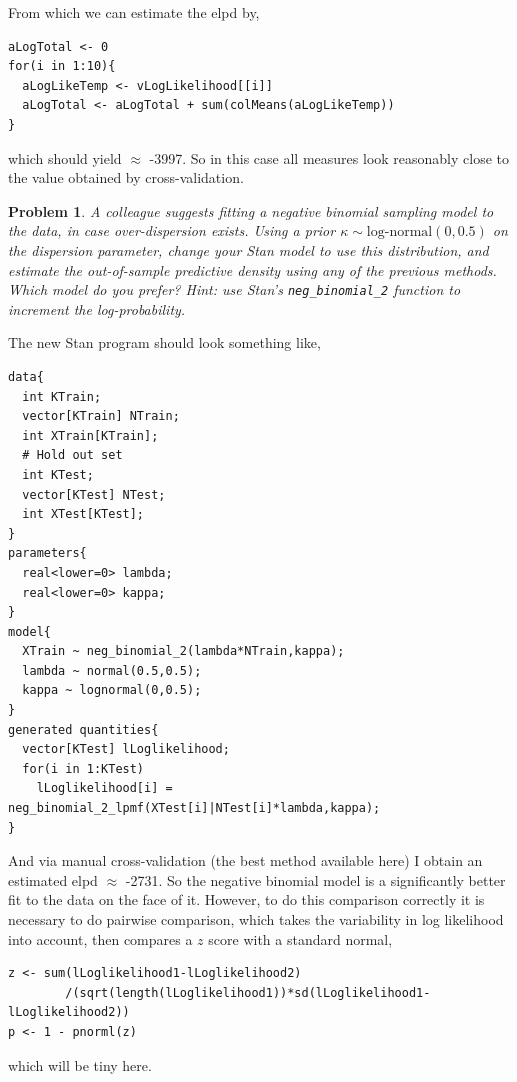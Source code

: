 \documentclass{article}
\newtheorem{problem}{Problem}[section]
\begin{document}
From which we can estimate the elpd by,

\begin{verbatim}
aLogTotal <- 0
for(i in 1:10){
  aLogLikeTemp <- vLogLikelihood[[i]] 
  aLogTotal <- aLogTotal + sum(colMeans(aLogLikeTemp))
}
\end{verbatim}

which should yield $\approx$ -3997. So in this case all measures look reasonably close to the value obtained by cross-validation.

\begin{problem}
	A colleague suggests fitting a negative binomial sampling model to the data, in case over-dispersion exists. Using a prior $\kappa\sim \text{log-normal}(0,0.5)$ on the dispersion parameter, change your Stan model to use this distribution, and estimate the out-of-sample predictive density using any of the previous methods. Which model do you prefer? Hint: use Stan's \texttt{neg_binomial_2} function to increment the log-probability.
\end{problem} 

The new Stan program should look something like,

\begin{verbatim}
data{
  int KTrain;
  vector[KTrain] NTrain;
  int XTrain[KTrain];
  # Hold out set
  int KTest;
  vector[KTest] NTest;
  int XTest[KTest];
}
parameters{
  real<lower=0> lambda;
  real<lower=0> kappa;
}
model{
  XTrain ~ neg_binomial_2(lambda*NTrain,kappa);
  lambda ~ normal(0.5,0.5);
  kappa ~ lognormal(0,0.5);
}
generated quantities{
  vector[KTest] lLoglikelihood;
  for(i in 1:KTest)
    lLoglikelihood[i] = neg_binomial_2_lpmf(XTest[i]|NTest[i]*lambda,kappa);
}
\end{verbatim}

And via manual cross-validation (the best method available here) I obtain an estimated elpd $\approx$ -2731. So the negative binomial model is a significantly better fit to the data on the face of it. However, to do this comparison correctly it is necessary to do pairwise comparison, which takes the variability in log likelihood into account, then compares a $z$ score with a standard normal,

\begin{verbatim}
z <- sum(lLoglikelihood1-lLoglikelihood2)
        /(sqrt(length(lLoglikelihood1))*sd(lLoglikelihood1-lLoglikelihood2))
p <- 1 - pnorml(z)
\end{verbatim}

which will be tiny here.
\end{document}
